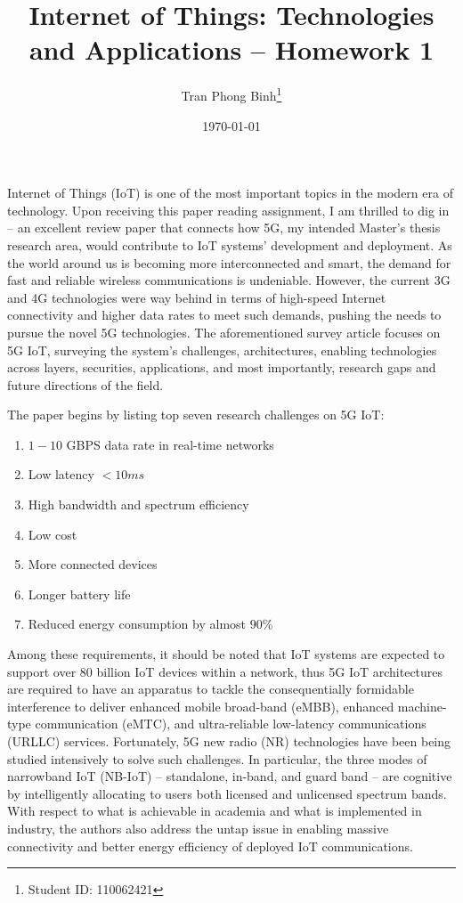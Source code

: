 \documentclass[12pt, a4paper, onside]{article}
\title{\textbf{Internet of Things: Technologies and Applications -- Homework 1}}
\author{Tran Phong Binh\thanks{Student ID: 110062421}}
\affil{Department of Computer Science, National Tsing Hua University}
\date{\today}
\begin{document}
\maketitle

Internet of Things (IoT) is one of the most important topics in the modern era of technology. Upon receiving this paper reading assignment, I am thrilled to dig in \cite{5giot} -- an excellent review paper that connects how 5G, my intended Master's thesis research area, would contribute to IoT systems’ development and deployment. As the world around us is becoming more interconnected and smart, the demand for fast and reliable wireless communications is undeniable. However, the current 3G and 4G technologies were way behind in terms of high-speed Internet connectivity and higher data rates to meet such demands, pushing the needs to pursue the novel 5G technologies. The aforementioned survey article focuses on 5G IoT, surveying the system's challenges, architectures, enabling technologies across layers, securities, applications, and most importantly, research gaps and future directions of the field.

The paper begins by listing top seven research challenges on 5G IoT:
\begin{enumerate}
  \item $1-10$ GBPS data rate in real-time networks
  \item Low latency $<10ms$
  \item High bandwidth and spectrum efficiency
  \item Low cost
  \item More connected devices
  \item Longer battery life
  \item Reduced energy consumption by almost $90\%$
\end{enumerate}
Among these requirements, it should be noted that IoT systems are expected to support over $80$ billion IoT devices within a network, thus 5G IoT architectures are required to have an apparatus to tackle the consequentially formidable interference to deliver enhanced mobile broad-band (eMBB), enhanced machine-type communication (eMTC), and ultra-reliable low-latency communications (URLLC) services. Fortunately, 5G new radio (NR) technologies have been being studied intensively to solve such challenges. In particular, the three modes of narrowband IoT (NB-IoT) -- standalone, in-band, and guard band -- are cognitive by intelligently allocating to users both licensed and unlicensed spectrum bands. With respect to what is achievable in academia and what is implemented in industry, the authors also address the untap issue in enabling massive connectivity and better energy efficiency of deployed IoT communications.
\end{document}
